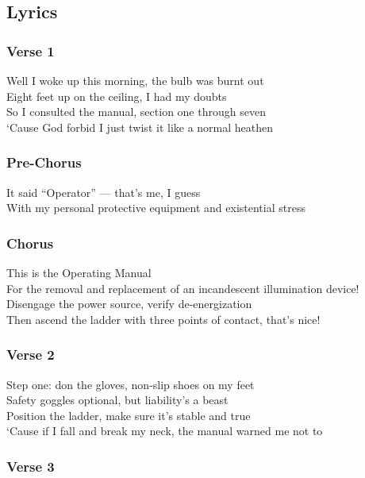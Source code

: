 \subsection{Lyrics}\label{lyrics-37}

\subsubsection{Verse 1}\label{verse-1-20}

Well I woke up this morning, the bulb was burnt out\\
Eight feet up on the ceiling, I had my doubts\\
So I consulted the manual, section one through seven\\
`Cause God forbid I just twist it like a normal heathen

\subsubsection{Pre-Chorus}\label{pre-chorus-24}

It said ``Operator'' --- that's me, I guess\\
With my personal protective equipment and existential stress

\subsubsection{Chorus}\label{chorus-47}

This is the Operating Manual\\
For the removal and replacement of an incandescent illumination
device!\\
Disengage the power source, verify de-energization\\
Then ascend the ladder with three points of contact, that's nice!

\subsubsection{Verse 2}\label{verse-2-21}

Step one: don the gloves, non-slip shoes on my feet\\
Safety goggles optional, but liability's a beast\\
Position the ladder, make sure it's stable and true\\
`Cause if I fall and break my neck, the manual warned me not to

\subsubsection{Verse 3}\label{verse-3-10}


